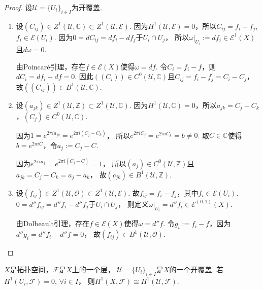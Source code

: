 \begin{proof}
	设$\mathscr{U}=\{U_i\}_{i\in I}$为开覆盖.
	\begin{enumerate}
		\item[1.] \qquad  设$(C_{ij})\in Z^1(\mathscr{U}, \mathbb{C})\subset Z^1(\mathscr{U},\mathcal{E})$. 
        因为$H^1(\mathscr{U}, \mathcal{E})=0$，所以$C_{ij}=f_i-f_j$, 
        $f_i\in \mathcal{E}(U_i)$. 因为$0=dC_{ij}=df_i-df_j$于$U_i\cap U_j$，
        所以$\omega|_{U_i}:=df_i\in \mathcal{E}^1(X)$且$d\omega=0$.

		\qquad 由Poincaré引理，存在$f\in \mathcal{E}(X)$使得$\omega=df$. 
        令$C_i=f_i-f$，则$dC_i=df_i-df=0$. 
        因此$((C_i))\in C^0(\mathscr{U},\mathbb{C})$且$C_{ij}=f_i-f_j=C_i-C_j$，
        故$((C_{ij}))\in B^1(\mathscr{U}, \mathbb{C})$.
			
		\item[2.] \qquad 设$(a_{jk})\in Z^1(\mathscr{U}, \mathbb{Z})\subset Z^1(\mathscr{U}, \mathbb{C})$. 
        因为$H^1(\mathscr{U}, \mathbb{C})=0$，所以$a_{jk}=C_j-C_k$，$(C_j)\in C^0(\mathscr{U}, \mathbb{C})$.

		\qquad 因为$1=e^{2\pi i a_{jk}}=e^{2\pi i (C_j-C_k)}$，
        所以$e^{2\pi i C_j}=e^{2\pi i C_k}=b\neq 0$. 
        取$C\in \mathbb{C}$使得$b=e^{2\pi i C}$，令$a_j:=C_j-C$.

		\qquad 因为$e^{2\pi i a_j}=e^{2\pi i(C_j-C)}=1$，
        所以$(a_j)\in C^0(\mathscr{U},\mathbb{Z})$且$a_{jk}=C_j-C_k=a_j-a_k$，
        故$(c_{jk})\in B^1(\mathscr{U}, \mathbb{Z})$.
			
		\item[3.] \qquad 设$(f_{ij})\in Z^1(\mathscr{U},\mathcal{O})\subset Z^1(\mathscr{U}, \mathcal{E})$. 
        故$f_{ij}=f_i-f_j$，其中$f_i\in \mathcal{E}(U_i)$. 
        $0=d''f_{ij}=d''f_i-d''f_j$于$U_i\cap U_j$，
        则定义$\omega|_{U_i}=d''f_i\in \mathcal{E}^{(0,1)}(X)$.

		\qquad 由Dolbeault引理，存在$f\in \mathcal{E}(X)$使得$\omega=d''f$. 
        令$g_i:=f_i-f$，因为$d''g_i=d''f_i-d''f=0$，
        故$(f_{ij})\in B^1(\mathscr{U}, \mathcal{O})$.\qedhere
	\end{enumerate}
\end{proof}
		
		
\begin{theorem}[Leray]
	$X$是拓扑空间，$\mathscr{F}$是$X$上的一个层，
    $\mathscr{U}=\{U_i\}_{i\in I}$是$X$的一个开覆盖. 
    若$H^1(U_i,\mathscr{F})=0$, $\forall i\in I$，
    则$H^1(X,\mathscr{F})\cong H^1(\mathscr{U}, \mathscr{F})$.
\end{theorem}
		
